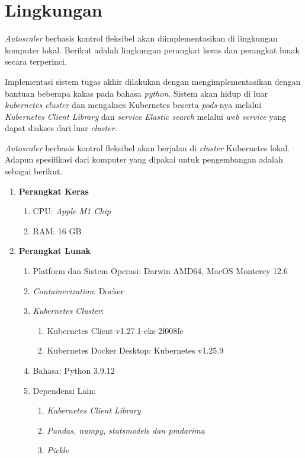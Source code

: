 \section{Lingkungan}

\textit{Autoscaler} berbasis kontrol fleksibel akan diimplementasikan di lingkungan komputer lokal. Berikut adalah lingkungan perangkat keras dan perangkat lunak secara terperinci.

Implementasi sistem tugas akhir dilakukan dengan mengimplementasikan dengan bantuan beberapa kakas pada bahasa \textit{python}. Sistem akan hidup di luar \textit{kubernetes cluster} dan mengakses Kubernetes beserta \textit{pods}-nya melalui \textit{Kubernetes Client Library} dan \textit{service Elastic search} melalui \textit{web service} yang dapat diakses dari luar \textit{cluster}.

\textit{Autoscaler} berbasis kontrol fleksibel akan berjalan di \textit{cluster} Kubernetes lokal. Adapun spesifikasi dari komputer yang dipakai untuk pengembangan adalah sebagai berikut.
\begin{enumerate}
    \item \textbf{Perangkat Keras}
    
        \begin{enumerate}
            \item CPU: \textit{Apple M1 Chip}
            \item RAM: 16 GB
        \end{enumerate}
    
    \item \textbf{Perangkat Lunak}
        
        \begin{enumerate}
            \item Platform dan Sistem Operasi: Darwin AMD64, MacOS Monterey 12.6
            \item \textit{Containerization}: Docker
            \item \textit{Kubernetes Cluster}:
                \begin{enumerate}
                    \item Kubernetes Client v1.27.1-eks-2f008fe
                    \item Kubernetes Docker Desktop: Kubernetes v1.25.9
                \end{enumerate}
            \item Bahasa: Python 3.9.12
            \item Dependensi Lain:
                \begin{enumerate}
                    \item \textit{Kubernetes Client Library}
                    \item \textit{Pandas, numpy, statsmodels dan pmdarima}
                    \item \textit{Pickle}
                \end{enumerate}
        \end{enumerate}
\end{enumerate}